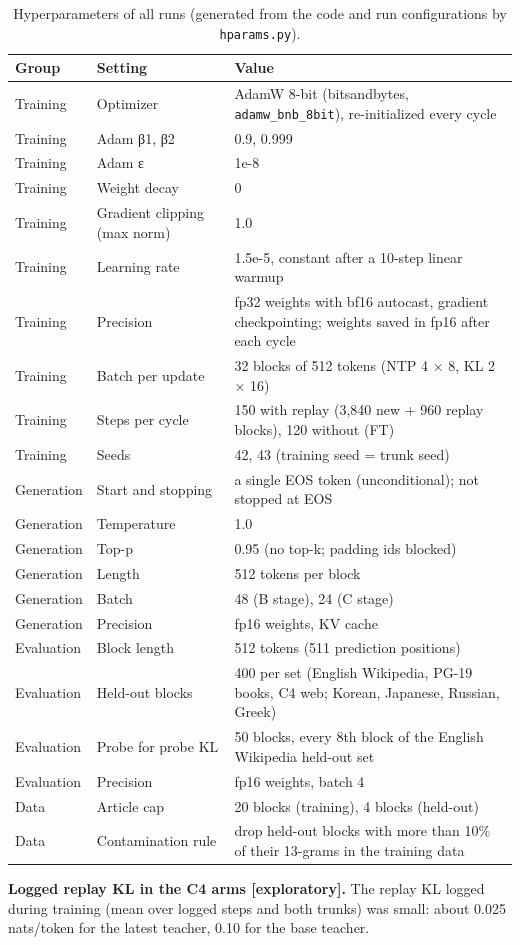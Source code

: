 \documentclass[11pt]{article}
\begin{document}
\begin{table}[t]
\centering
\small
\caption{Hyperparameters of all runs (generated from the code and run configurations by \texttt{hparams.py}).}
\label{tab:3}
\begin{tabularx}{\linewidth}{llX}
\toprule
\textbf{Group} & \textbf{Setting} & \textbf{Value} \\
\midrule
Training & Optimizer & AdamW 8-bit (bitsandbytes, \texttt{adamw\_bnb\_8bit}), re-initialized every cycle \\
Training & Adam β1, β2 & 0.9, 0.999 \\
Training & Adam ε & 1e-8 \\
Training & Weight decay & 0 \\
Training & Gradient clipping (max norm) & 1.0 \\
Training & Learning rate & 1.5e-5, constant after a 10-step linear warmup \\
Training & Precision & fp32 weights with bf16 autocast, gradient checkpointing; weights saved in fp16 after each cycle \\
Training & Batch per update & 32 blocks of 512 tokens (NTP 4 × 8, KL 2 × 16) \\
Training & Steps per cycle & 150 with replay (3,840 new + 960 replay blocks), 120 without (FT) \\
Training & Seeds & 42, 43 (training seed = trunk seed) \\
Generation & Start and stopping & a single EOS token (unconditional); not stopped at EOS \\
Generation & Temperature & 1.0 \\
Generation & Top-p & 0.95 (no top-k; padding ids blocked) \\
Generation & Length & 512 tokens per block \\
Generation & Batch & 48 (B stage), 24 (C stage) \\
Generation & Precision & fp16 weights, KV cache \\
Evaluation & Block length & 512 tokens (511 prediction positions) \\
Evaluation & Held-out blocks & 400 per set (English Wikipedia, PG-19 books, C4 web; Korean, Japanese, Russian, Greek) \\
Evaluation & Probe for probe KL & 50 blocks, every 8th block of the English Wikipedia held-out set \\
Evaluation & Precision & fp16 weights, batch 4 \\
Data & Article cap & 20 blocks (training), 4 blocks (held-out) \\
Data & Contamination rule & drop held-out blocks with more than 10\% of their 13-grams in the training data \\
\bottomrule
\end{tabularx}
\end{table}

\textbf{Logged replay KL in the C4 arms [exploratory].} The replay KL logged during training (mean over logged steps and both trunks) was small: about 0.025 nats/token for the latest teacher, 0.10 for the base teacher.
\end{document}
